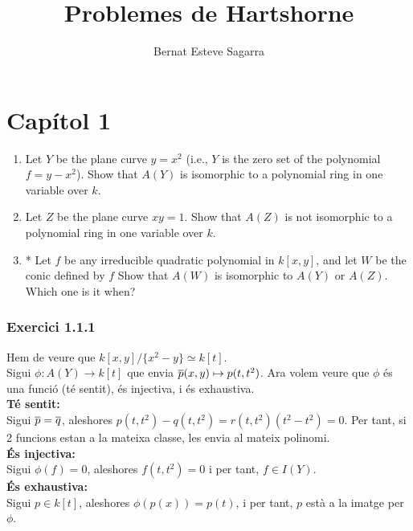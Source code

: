 \documentclass[11pt, a4paper]{article}
\title{Problemes de Hartshorne}
\author{Bernat Esteve Sagarra}
\begin{document}
\pagestyle{fancy}
% 
\section*{Capítol 1}
\begin{tcolorbox}[title=\subsection{Exercici 1.1}]
\begin{enumerate}
    \item Let $Y$ be the plane curve $y = x^2$ (i.e., $Y$ is the zero set of the polynomial $f = y - x^2$). Show that $A(Y)$ is isomorphic to a polynomial ring in one variable over $k$.
    \item Let $Z$ be the plane curve $xy = 1$. Show that $A(Z)$ is not isomorphic to a polynomial ring in one variable over $k$.
    \item* Let $f$ be any irreducible quadratic polynomial in $k[x,y]$, and let $W$ be the conic defined by $f$ Show that $A(W)$ is isomorphic to $A(Y)$ or $A(Z)$. Which one is it when?
\end{enumerate}
\end{tcolorbox}
\subsubsection{Exercici 1.1.1}
Hem de veure que $k[x,y]/\{x^2-y\}\simeq k[t]$.\\
Sigui $\phi:A(Y)\to k[t]$ que envia $\overline p(x,y)\mapsto p(t,t^2)$. Ara volem veure que $\phi$ és una funció (té sentit), és injectiva, i és exhaustiva.\\[3mm]
\textbf{Té sentit:}\\
Sigui $\overline p=\overline q$, aleshores $p(t,t^2)-q(t,t^2)=r(t,t^2)(t^2-t^2)=0$. Per tant, si 2 funcions estan a la mateixa classe, les envia al mateix polinomi.\\[2mm]
\textbf{És injectiva:}\\
Sigui $\phi(f)=0$, aleshores $f(t,t^2)=0$ i per tant, $f\in I(Y)$.\\[2mm]
\textbf{És exhaustiva:}\\
Sigui $p\in k[t]$, aleshores $\phi(p(x))=p(t)$, i per tant, $p$ està a la imatge per $\phi$.\\[5mm]
\end{document}
